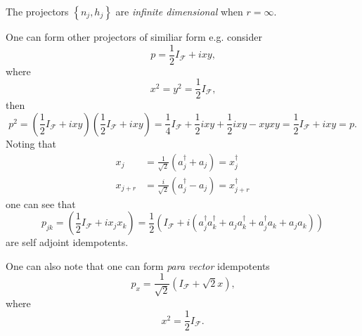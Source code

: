 \documentclass[aps, preprint]{revtex4}
\begin{document}
The projectors $\left \{n_{j} ,h_{j}\right \}$ are \emph{infinite dimensional} when $r =\infty $. 

One can form other projectors of similiar form e.g. consider
\begin{equation}p =\frac{1}{2} I_{\mathcal{F}} +i x y\text{,}
\end{equation}where
\begin{equation}x^{2} =y^{2} =\frac{1}{2} I_{\mathcal{F}}\text{,}
\end{equation}then
\begin{equation}p^{2} =\left (\frac{1}{2} I_{\mathcal{F}} +i x y\right ) \left (\frac{1}{2} I_{\mathcal{F}} +i x y\right ) =\frac{1}{4} I_{\mathcal{F}} +\frac{1}{2} i x y +\frac{1}{2} i x y -x y x y =\frac{1}{2} I_{\mathcal{F}} +i x y =p\text{.}
\end{equation}Noting that
\begin{align}x_{j} &  =\frac{1}{\sqrt{2}} \left (a_{j}^{ \dag } +a_{j}\right ) =x_{j}^{ \dag } \\
x_{j +r} &  =\frac{i}{\sqrt{2}} \left (a_{j}^{ \dag } -a_{j}\right ) =x_{j +r}^{ \dag }\end{align}one can see that
\begin{equation}p_{j k} =\left (\frac{1}{2} I_{\mathcal{F}} +i x_{j} x_{k}\right ) =\frac{1}{2} \left (I_{\mathcal{F}} +i \left (a_{j}^{ \dag } a_{k}^{ \dag } +a_{j} a_{k}^{ \dag } +a_{j}^{ \dag } a_{k} +a_{j} a_{k}\right )\right )
\end{equation}are self adjoint idempotents. 

One can also note that one can form \emph{para vector}
idempotents
\begin{equation}p_{x} =\frac{1}{\sqrt{2}} \left (I_{\mathcal{F}} +\sqrt{2} x\right )\text{,}
\end{equation}where
\begin{equation}x^{2} =\frac{1}{2} I_{\mathcal{F}}\text{.}
\end{equation}
\end{document}
